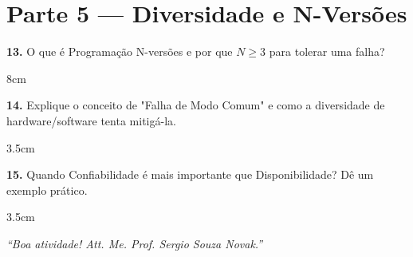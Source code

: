 \documentclass[12pt]{article}
\begin{document}
  \section*{Parte 5 — Diversidade e N-Versões}

  \textbf{13.} O que é Programação N-versões e por que $N \ge 3$ para tolerar uma falha?
  \begin{resposta}{8cm}
  \end{resposta}

  \textbf{14.} Explique o conceito de "Falha de Modo Comum" e como a diversidade de hardware/software tenta mitigá-la.
  \begin{resposta}{3.5cm}
  \end{resposta}

  \textbf{15.} Quando Confiabilidade é mais importante que Disponibilidade? Dê um exemplo prático.
  \begin{resposta}{3.5cm}
  \end{resposta}

  \vspace{1cm}

  \begin{center}
      \textit{“Boa atividade! Att. Me. Prof. Sergio Souza Novak.”}
  \end{center}

\end{document}
